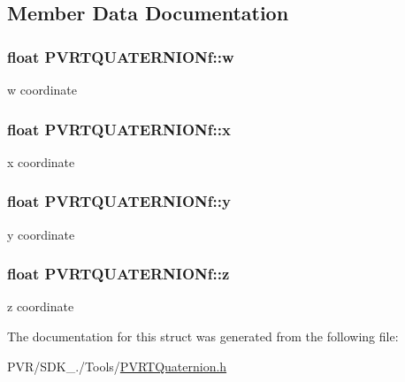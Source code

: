 \subsection{Member Data Documentation}
\hypertarget{struct_p_v_r_t_q_u_a_t_e_r_n_i_o_nf_a3d9d748a6861ec57ad8ac2d959b53edf}{
\subsubsection[{w}]{\setlength{\rightskip}{0pt plus 5cm}float P\+V\+R\+T\+Q\+U\+A\+T\+E\+R\+N\+I\+O\+Nf\+::w}}\label{struct_p_v_r_t_q_u_a_t_e_r_n_i_o_nf_a3d9d748a6861ec57ad8ac2d959b53edf}
w coordinate \hypertarget{struct_p_v_r_t_q_u_a_t_e_r_n_i_o_nf_a1ff9af950eb62ececdcadcb53412c36d}{
\subsubsection[{x}]{\setlength{\rightskip}{0pt plus 5cm}float P\+V\+R\+T\+Q\+U\+A\+T\+E\+R\+N\+I\+O\+Nf\+::x}}\label{struct_p_v_r_t_q_u_a_t_e_r_n_i_o_nf_a1ff9af950eb62ececdcadcb53412c36d}
x coordinate \hypertarget{struct_p_v_r_t_q_u_a_t_e_r_n_i_o_nf_abf4c8afb82239d9a6b051be41f98d166}{
\subsubsection[{y}]{\setlength{\rightskip}{0pt plus 5cm}float P\+V\+R\+T\+Q\+U\+A\+T\+E\+R\+N\+I\+O\+Nf\+::y}}\label{struct_p_v_r_t_q_u_a_t_e_r_n_i_o_nf_abf4c8afb82239d9a6b051be41f98d166}
y coordinate \hypertarget{struct_p_v_r_t_q_u_a_t_e_r_n_i_o_nf_a561786d0d1dac4408afe3369c88c9856}{
\subsubsection[{z}]{\setlength{\rightskip}{0pt plus 5cm}float P\+V\+R\+T\+Q\+U\+A\+T\+E\+R\+N\+I\+O\+Nf\+::z}}\label{struct_p_v_r_t_q_u_a_t_e_r_n_i_o_nf_a561786d0d1dac4408afe3369c88c9856}
z coordinate 

The documentation for this struct was generated from the following file\+:\begin{DoxyCompactItemize}
\item 
P\+V\+R/\+S\+D\+K\+\_./\+Tools/\hyperlink{_p_v_r_t_quaternion_8h}{P\+V\+R\+T\+Quaternion.\+h}\end{DoxyCompactItemize}
